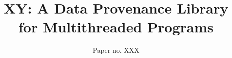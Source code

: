 \documentclass{IEEEtran}
\newcommand{\projecttitle}{\textsc{XY}\xspace}
\newcommand{\intelpt}{{Intel\textsuperscript{\textregistered} PT}\xspace}
\begin{document}
\author{
Paper no. XXX %
}

\title{\Large \projecttitle: A Data Provenance Library for Multithreaded Programs}%
\maketitle














\footnotesize


 
\end{document}
